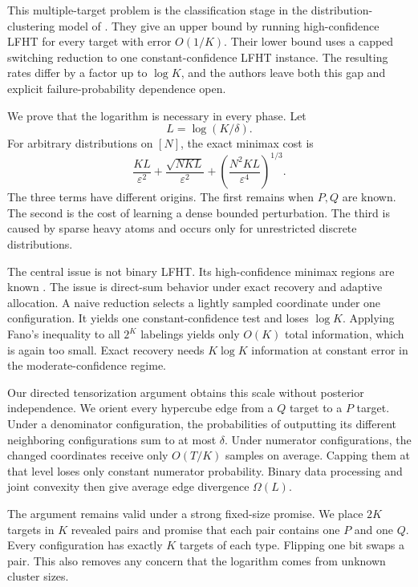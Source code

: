 \documentclass[twoside]{article}
\begin{document}
This multiple-target problem is the classification stage in the distribution-clustering model of \citet{kumar2026clustering}. They give an upper bound by running high-confidence LFHT for every target with error $O(1/K)$. Their lower bound uses a capped switching reduction to one constant-confidence LFHT instance. The resulting rates differ by a factor up to $\log K$, and the authors leave both this gap and explicit failure-probability dependence open.

We prove that the logarithm is necessary in every phase. Let \[ L=\log(K/\delta). \] For arbitrary distributions on $[N]$, the exact minimax cost is
\begin{equation}
\frac{KL}{\varepsilon^2}
+\frac{\sqrt{NKL}}{\varepsilon^2}
+\left(\frac{N^2KL}{\varepsilon^4}\right)^{1/3}.
\label{eq:headline}
\end{equation}
The three terms have different origins. The first remains when $P,Q$ are known. The second is the cost of learning a dense bounded perturbation. The third is caused by sparse heavy atoms and occurs only for unrestricted discrete distributions.

The central issue is not binary LFHT. Its high-confidence minimax regions are known \citep{gerber2023classification}. The issue is direct-sum behavior under exact recovery and adaptive allocation. A naive reduction selects a lightly sampled coordinate under one configuration. It yields one constant-confidence test and loses $\log K$. Applying Fano's inequality to all $2^K$ labelings yields only $O(K)$ total information, which is again too small. Exact recovery needs $K\log K$ information at constant error in the moderate-confidence regime.

Our directed tensorization argument obtains this scale without posterior independence. We orient every hypercube edge from a $Q$ target to a $P$ target. Under a denominator configuration, the probabilities of outputting its different neighboring configurations sum to at most $\delta$. Under numerator configurations, the changed coordinates receive only $O(T/K)$ samples on average. Capping them at that level loses only constant numerator probability. Binary data processing and joint convexity then give average edge divergence $\Omega(L)$.

The argument remains valid under a strong fixed-size promise. We place $2K$ targets in $K$ revealed pairs and promise that each pair contains one $P$ and one $Q$. Every configuration has exactly $K$ targets of each type. Flipping one bit swaps a pair. This also removes any concern that the logarithm comes from unknown cluster sizes.
\end{document}
